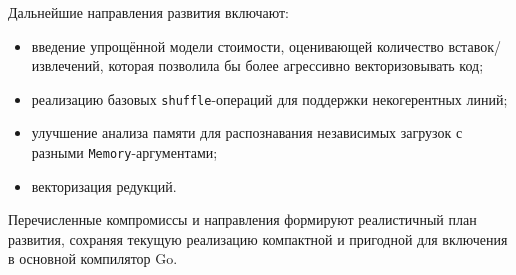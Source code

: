 Дальнейшие направления развития включают:
\begin{itemize}
    \item введение упрощённой модели стоимости, оценивающей количество вставок/извлечений, которая позволила бы более агрессивно векторизовывать код;
    \item реализацию базовых \texttt{shuffle}-операций для поддержки некогерентных линий;
    \item улучшение анализа памяти для распознавания независимых загрузок с разными \texttt{Memory}-аргументами;
    \item векторизация редукций.
\end{itemize}

Перечисленные компромиссы и направления формируют реалистичный план развития, сохраняя текущую реализацию компактной и пригодной для включения в основной компилятор Go.